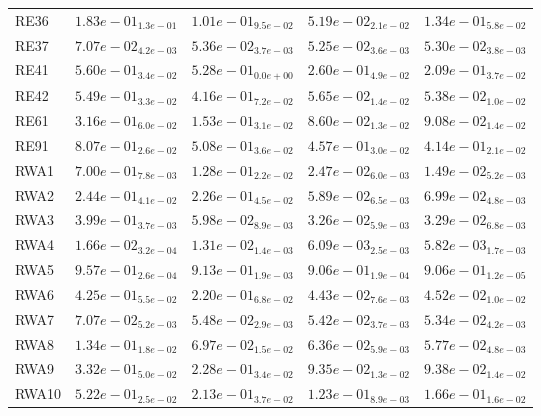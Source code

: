 \documentclass{article}
\begin{document}
\begin{table}
\begin{scriptsize}
\begin{tabular}{lllll}
RE36 & $  1.83e-01_{ 1.3e-01}$ & \cellcolor{gray25}$  1.01e-01_{ 9.5e-02}$ & \cellcolor{gray95}$  5.19e-02_{ 2.1e-02}$ & $  1.34e-01_{ 5.8e-02}$ \\
RE37 & $  7.07e-02_{ 4.2e-03}$ & $  5.36e-02_{ 3.7e-03}$ & \cellcolor{gray95}$  5.25e-02_{ 3.6e-03}$ & \cellcolor{gray25}$  5.30e-02_{ 3.8e-03}$ \\
RE41 & $  5.60e-01_{ 3.4e-02}$ & $  5.28e-01_{ 0.0e+00}$ & \cellcolor{gray25}$  2.60e-01_{ 4.9e-02}$ & \cellcolor{gray95}$  2.09e-01_{ 3.7e-02}$ \\
RE42 & $  5.49e-01_{ 3.3e-02}$ & $  4.16e-01_{ 7.2e-02}$ & \cellcolor{gray25}$  5.65e-02_{ 1.4e-02}$ & \cellcolor{gray95}$  5.38e-02_{ 1.0e-02}$ \\
RE61 & $  3.16e-01_{ 6.0e-02}$ & $  1.53e-01_{ 3.1e-02}$ & \cellcolor{gray95}$  8.60e-02_{ 1.3e-02}$ & \cellcolor{gray25}$  9.08e-02_{ 1.4e-02}$ \\
RE91 & $  8.07e-01_{ 2.6e-02}$ & $  5.08e-01_{ 3.6e-02}$ & \cellcolor{gray25}$  4.57e-01_{ 3.0e-02}$ & \cellcolor{gray95}$  4.14e-01_{ 2.1e-02}$ \\
RWA1 & $  7.00e-01_{ 7.8e-03}$ & $  1.28e-01_{ 2.2e-02}$ & \cellcolor{gray25}$  2.47e-02_{ 6.0e-03}$ & \cellcolor{gray95}$  1.49e-02_{ 5.2e-03}$ \\
RWA2 & $  2.44e-01_{ 4.1e-02}$ & $  2.26e-01_{ 4.5e-02}$ & \cellcolor{gray95}$  5.89e-02_{ 6.5e-03}$ & \cellcolor{gray25}$  6.99e-02_{ 4.8e-03}$ \\
RWA3 & $  3.99e-01_{ 3.7e-03}$ & $  5.98e-02_{ 8.9e-03}$ & \cellcolor{gray95}$  3.26e-02_{ 5.9e-03}$ & \cellcolor{gray25}$  3.29e-02_{ 6.8e-03}$ \\
RWA4 & $  1.66e-02_{ 3.2e-04}$ & $  1.31e-02_{ 1.4e-03}$ & \cellcolor{gray25}$  6.09e-03_{ 2.5e-03}$ & \cellcolor{gray95}$  5.82e-03_{ 1.7e-03}$ \\
RWA5 & $  9.57e-01_{ 2.6e-04}$ & $  9.13e-01_{ 1.9e-03}$ & \cellcolor{gray25}$  9.06e-01_{ 1.9e-04}$ & \cellcolor{gray95}$  9.06e-01_{ 1.2e-05}$ \\
RWA6 & $  4.25e-01_{ 5.5e-02}$ & $  2.20e-01_{ 6.8e-02}$ & \cellcolor{gray95}$  4.43e-02_{ 7.6e-03}$ & \cellcolor{gray25}$  4.52e-02_{ 1.0e-02}$ \\
RWA7 & $  7.07e-02_{ 5.2e-03}$ & $  5.48e-02_{ 2.9e-03}$ & \cellcolor{gray25}$  5.42e-02_{ 3.7e-03}$ & \cellcolor{gray95}$  5.34e-02_{ 4.2e-03}$ \\
RWA8 & $  1.34e-01_{ 1.8e-02}$ & $  6.97e-02_{ 1.5e-02}$ & \cellcolor{gray25}$  6.36e-02_{ 5.9e-03}$ & \cellcolor{gray95}$  5.77e-02_{ 4.8e-03}$ \\
RWA9 & $  3.32e-01_{ 5.0e-02}$ & $  2.28e-01_{ 3.4e-02}$ & \cellcolor{gray95}$  9.35e-02_{ 1.3e-02}$ & \cellcolor{gray25}$  9.38e-02_{ 1.4e-02}$ \\
RWA10 & $  5.22e-01_{ 2.5e-02}$ & $  2.13e-01_{ 3.7e-02}$ & \cellcolor{gray95}$  1.23e-01_{ 8.9e-03}$ & \cellcolor{gray25}$  1.66e-01_{ 1.6e-02}$ \\
\hline
\end{tabular}
\end{scriptsize}
\end{table}
\end{document}
